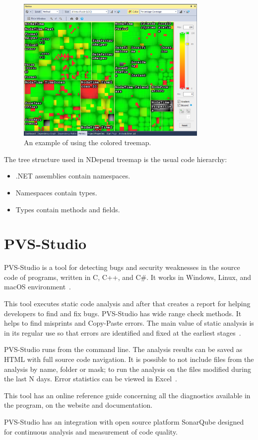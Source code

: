 \begin{figure}[h]
	\centering
	\includegraphics[height=70mm]{figures/tree.png}
	\caption{An example of using the colored treemap.}
	\label{fig:tree}
\end{figure}

The tree structure used in NDepend treemap is the usual code hierarchy: 

\begin{itemize}
	\item .NET assemblies contain namespaces.
	\item Namespaces contain types.
	\item Types contain methods and fields.
\end{itemize}

\section{PVS-Studio}

PVS-Studio is a tool for detecting bugs and security weaknesses in the source code of programs, written in C, C++, and C\#. It works in Windows, Linux, and macOS environment~\cite{pvs}.

This tool executes static code analysis and after that creates a report for helping developers to find and fix bugs. PVS-Studio has wide range check methods. It helps to find misprints and Copy-Paste errors. The main value of static analysis is in its regular use so that errors are identified and fixed at the earliest stages~\cite{pvs}. 

PVS-Studio runs from the command line. The analysis results can be saved as HTML with full source code navigation. It is possible to not include files from the analysis by name, folder or mask; to run the analysis on the files modified during the last N days. Error statistics can be viewed in Excel~\cite{pvs}. 

This tool has an online reference guide concerning all the diagnostics available in the program, on the website and documentation. 

PVS-Studio has an integration with open source platform SonarQube designed for continuous analysis and measurement of code quality.